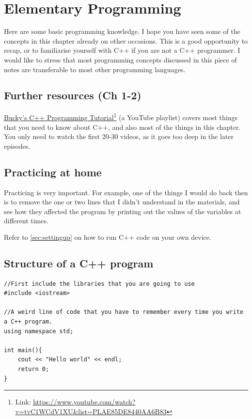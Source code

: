 \chapter{Elementary Programming}
\label{sec:elementary}

Here are some basic programming knowledge. I hope you have seen some of the concepts in this chapter already on other occasions. This is a good opportunity to recap, or to familiarise yourself with C++ if you are not a C++ programmer. I would like to stress that most programming concepts discussed in this piece of notes are transferable to most other programming languages.


\section*{Further resources (Ch 1-2)}
\href{https://www.youtube.com/watch?v=tvC1WCdV1XU&list=PLAE85DE8440AA6B83}{Bucky's C++ Programming Tutorial}\footnote{Link: \url{https://www.youtube.com/watch?v=tvC1WCdV1XU&list=PLAE85DE8440AA6B83}} (a YouTube playlist) covers most things that you need to know about C++, and also most of the things in this chapter. You only need to watch the first 20-30 videos, as it goes too deep in the later episodes.

\section*{Practicing at home}
Practicing is very important. For example, one of the things I would do back then is to remove the one or two lines that I didn't understand in the materials, and see how they affected the program by printing out the values of the variables at different times. 

Refer to \cref{sec:settingup} on how to run C++ code on your own device.

\section{Structure of a C++ program}
\begin{lstlisting}
//First include the libraries that you are going to use
#include <iostream> 

//A weird line of code that you have to remember every time you write a C++ program.
using namespace std;

int main(){
    cout << "Hello world" << endl;
    return 0;
}
\end{lstlisting}

